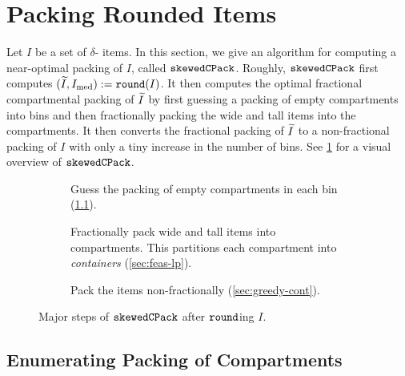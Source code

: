 \section{Packing Rounded Items}
\label{sec:thin-bp:algo}

Let $I$ be a set of $\delta$-\thin{} items. In this section,
we give an algorithm for computing a near-optimal packing of $I$, called $\operatorname{\mathtt{skewedCPack}}$.
Roughly, $\operatorname{\mathtt{skewedCPack}}$ first computes $(\widetilde{I}, I_{\mathrm{med}}) := \operatorname{\mathtt{round}}(I)$.
It then computes the optimal fractional compartmental packing of $\widetilde{I}$
by first guessing a packing of empty compartments into bins
and then fractionally packing the wide and tall items into the compartments.
It then converts the fractional packing of $\widetilde{I}$ to a non-fractional packing of $I$
with only a tiny increase in the number of bins.
See \cref{fig:thincpack} for a visual overview of $\operatorname{\mathtt{skewedCPack}}$.

\begin{figure}[htb]
\begin{subfigure}[t]{0.3\textwidth}
\centering
{}

\caption{Guess the packing of empty compartments in each bin (\cref{sec:enum-configs}).}
\end{subfigure}
\hfill
\begin{subfigure}[t]{0.3\textwidth}
\centering
{}

\caption{Fractionally pack wide and tall items into compartments.
This partitions each compartment into \emph{containers} (\cref{sec:feas-lp}).}
\end{subfigure}
\hfill
\begin{subfigure}[t]{0.3\textwidth}
\centering
{}

\caption{Pack the items non-fractionally (\cref{sec:greedy-cont}).}
\end{subfigure}
\caption{Major steps of $\operatorname{\mathtt{skewedCPack}}$ after $\operatorname{\mathtt{round}}$ing $I$.}
\label{fig:thincpack}
\end{figure}

\subsection{Enumerating Packing of Compartments}
\label{sec:enum-configs}

